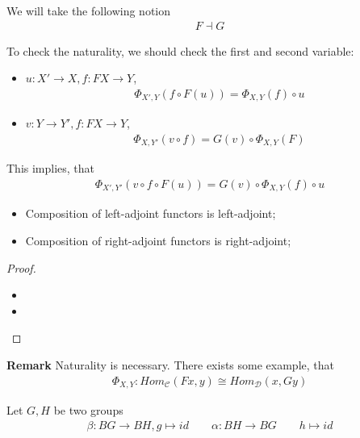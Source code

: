 \documentclass[Total.tex]{subfiles}
\begin{document}
			We will take the following notion
			\begin{gather*}
				F\dashv G
			\end{gather*}
			
			To check the naturality, we should check the first and second variable:
			\begin{itemize}
				\item $u:X'\rightarrow X,f:FX\rightarrow Y$,
				\begin{gather*}
					\Phi_{X',Y}(f\circ F(u))=\Phi_{X,Y}(f)\circ u
				\end{gather*}
				\item $v:Y\rightarrow Y',f:FX\rightarrow Y$,
				\begin{gather*}
					\Phi_{X,Y'}(v\circ f)=G(v)\circ \Phi_{X,Y}(F)
				\end{gather*}
			\end{itemize}
			
			This implies, that
			\begin{gather*}
				\Phi_{X',Y'}(v\circ f\circ F(u))=G(v)\circ \Phi_{X,Y}(f)\circ u
			\end{gather*}
			
			\begin{proposition}
				\begin{itemize}
					\item Composition of left-adjoint functors is left-adjoint;
					
					\item Composition of right-adjoint functors is right-adjoint;
				\end{itemize}
			\end{proposition}
			\begin{proof}
				\begin{itemize}
					\item 
					\item 
				\end{itemize}
			\end{proof}
			
			\textbf{Remark} Naturality is necessary. There exists some example, that
			\begin{gather*}
				\Phi_{X,Y}: Hom_\mathcal{C}(Fx,y)\cong Hom_\mathcal{D}(x,Gy)
			\end{gather*}
			
			Let $G,H$ be two groups
			\begin{gather*}
				\beta:BG\rightarrow BH,g\mapsto id\qquad \alpha:BH\rightarrow BG\qquad h\mapsto id
			\end{gather*}
			
\end{document}
